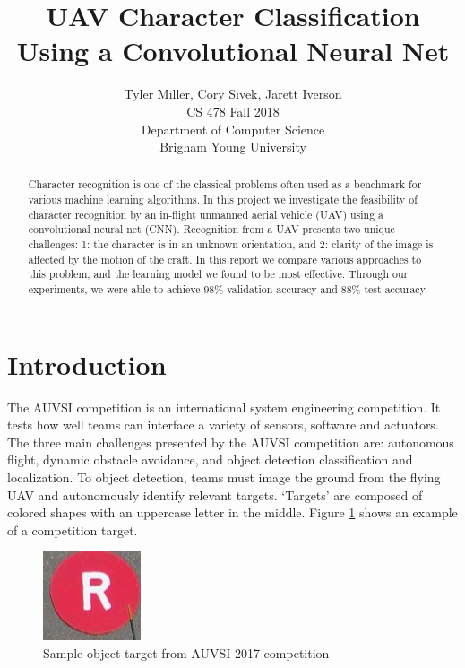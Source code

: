 \documentclass{article}
\title{UAV Character Classification Using a Convolutional Neural Net}
\author{Tyler Miller, Cory Sivek, Jarett Iverson \\
CS 478 Fall 2018 \\
Department of Computer Science\\
Brigham Young University}
\begin{document}
\maketitle

\begin{abstract}
  Character recognition is one of the classical problems often used as a benchmark for various machine learning algorithms. In this project we investigate the feasibility of character recognition by an in-flight unmanned aerial vehicle (UAV) using a convolutional neural net (CNN). Recognition from a UAV presents two unique challenges: 1: the character is in an unknown orientation, and 2: clarity of the image is affected by the motion of the craft. In this report we compare various approaches to this problem, and the learning model we found to be most effective. Through our experiments, we were able to achieve 98\% validation accuracy and 88\% test accuracy. 
\end{abstract}

\section{Introduction}

The AUVSI competition is an international system engineering competition. It tests how well 
teams can interface a variety of sensors, software and actuators. The three main challenges 
presented by the AUVSI competition are: autonomous flight, dynamic obstacle avoidance, and 
object detection classification and localization. To object detection, teams must image the 
ground from the flying UAV and autonomously identify relevant targets. ‘Targets’ are composed 
of colored shapes with an uppercase letter in the middle. Figure \ref{fig:sampleTarget} shows an example of a 
competition target.

\begin{figure}[H]
  \begin{center}
  \includegraphics[width=0.4\linewidth]{./figs/target-R.png}
  \caption{Sample object target from AUVSI 2017 competition}
  \label{fig:sampleTarget}
  \end{center}
\end{figure}
\end{document}
